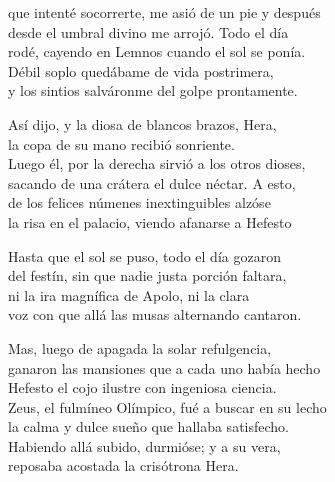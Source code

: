 que intenté socorrerte, me asió de un pie y después\\
desde el umbral divino me arrojó. Todo el día\\
rodé, cayendo en Lemnos cuando el sol se ponía.\\
Débil soplo quedábame de vida postrimera,\\
y los sintios salváronme del golpe prontamente.\par
Así dijo, y la diosa de blancos brazos, Hera,\\
la copa de su mano recibió sonriente.\\
Luego él, por la derecha sirvió a los otros dioses,\\
sacando de una crátera el dulce néctar. A esto,\\
de los felices númenes inextinguibles alzóse\\
la risa en el palacio, viendo afanarse a Hefesto\par
Hasta que el sol se puso, todo el día gozaron\\
del festín, sin que nadie justa porción faltara,\\
ni la ira magnífica de Apolo, ni la clara\\
voz con que allá las musas alternando cantaron.\par
Mas, luego de apagada la solar refulgencia,\\
ganaron las mansiones que a cada uno había hecho\\
Hefesto el cojo ilustre con ingeniosa ciencia.\\
Zeus, el fulmíneo Olímpico, fué a buscar en su lecho\\
la calma y dulce sueño que hallaba satisfecho.\\
Habiendo allá subido, durmióse; y a su vera,\\
reposaba acostada la crisótrona Hera.
\pend
\endnumbering